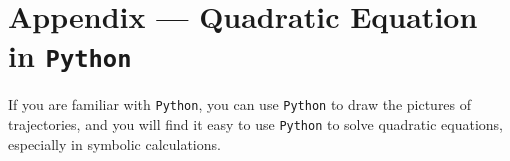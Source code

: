 \appendix
\section*{Appendix --- Quadratic Equation in \texttt{Python}}\label{A:python}
If you are familiar with \texttt{Python}, you can use \texttt{Python} to draw the pictures of trajectories, and you will find it easy to use \texttt{Python} to solve quadratic equations, especially in symbolic calculations.


